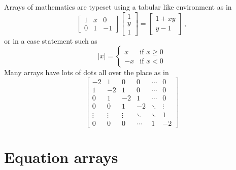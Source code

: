 \documentclass[12pt,a4paper]{article}
\begin{document}
Arrays of mathematics are typeset using a tabular like environment as 
in
\begin{displaymath}
	\left[
	\begin{array}{ccc}
		1 & x & 0 \\
		0 & 1 & -1
	\end{array}\right] 
	\left[
	\begin{array}{c}
		1  \\
		y  \\
		1
	\end{array}\right]
	=\left[ 
	\begin{array}{c}
		1+xy  \\
		y-1
	\end{array} \right]\,,
\end{displaymath}
or in a case statement such as
\begin{displaymath}
	|x|=\left\{
	\begin{array}{rl}
		x & \mbox{if }x\geq 0  \\
		-x & \mbox{if }x< 0
	\end{array}\right.
\end{displaymath}
Many arrays have lots of dots all over the place as in
\begin{displaymath}
	\left[
	\begin{array}{cccccc}
		-2 & 1 & 0 & 0 & \cdots & 0  \\
		1 & -2 & 1 & 0 & \cdots & 0  \\
		0 & 1 & -2 & 1 & \cdots & 0  \\
		0 & 0 & 1 & -2 & \ddots & \vdots \\
		\vdots & \vdots & \vdots & \ddots & \ddots & 1  \\
		0 & 0 & 0 & \cdots & 1 & -2
	\end{array}\right]
\end{displaymath}






\section{Equation arrays}
\end{document}
